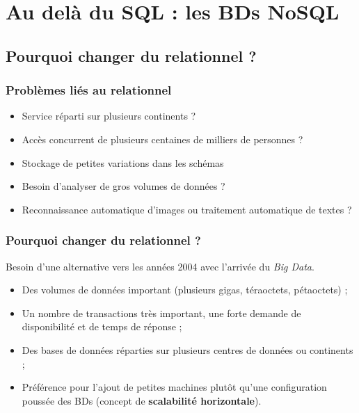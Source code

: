 \section{Au delà du SQL : les BDs NoSQL}

	\subsection{Pourquoi changer du relationnel ?}
	\begin{frame}
		\frametitle{Problèmes liés au relationnel}

		\begin{itemize}
			\item Service réparti sur plusieurs continents ?
			\item Accès concurrent de plusieurs centaines de milliers de personnes ?
			\item Stockage de petites variations dans les schémas
			\item Besoin d'analyser de gros volumes de données ?
			\item Reconnaissance automatique d'images ou traitement automatique de textes ?
		\end{itemize}

	\end{frame}

	\begin{frame}
		\frametitle{Pourquoi changer du relationnel ?}

		Besoin d'une alternative vers les années 2004 avec l'arrivée du \textit{Big Data}.
		\begin{itemize}
			\item Des volumes de données important (plusieurs gigas, téraoctets, pétaoctets) ;
			\item Un nombre de transactions très important, une forte demande de disponibilité et de temps de réponse ;
			\item Des bases de données réparties sur plusieurs centres de données ou continents ;
			\item Préférence pour l'ajout de petites machines plutôt qu'une configuration poussée des BDs (concept de \textbf{scalabilité horizontale}).
		\end{itemize}

	\end{frame}

